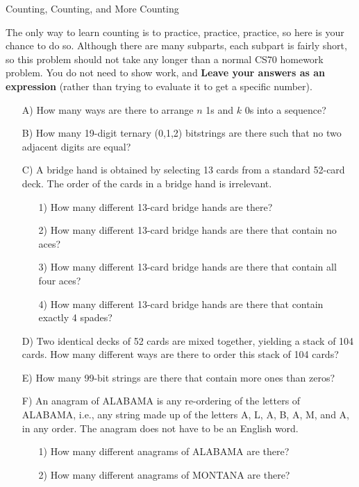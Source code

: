 \begin{homeworkProblem}{Counting, Counting, and More Counting}

The only way to learn counting is to practice, practice, practice, so
here is your chance to do so. Although there are many subparts, each 
subpart is fairly short, so this problem should not take any longer 
than a normal CS70 homework problem. You do not need to show work, and
\textbf{Leave your answers as an expression} (rather than trying to 
evaluate it to get a specific number).
\begin{itemize}

\item[A)] How many ways are there to arrange $n$ 1s and $k$ 0s into a 
sequence?

\item[B)] How many 19-digit ternary (0,1,2) bitstrings are there such 
that no two adjacent digits are equal?

\item[C)] A bridge hand is obtained by selecting 13 cards from a 
standard 52-card deck. The order of the cards in a bridge hand is 
irrelevant.
  \begin{itemize}
    \item[1)] How many different 13-card bridge hands are there? 
    \item[2)] How many different 13-card bridge hands are there that 
    contain no aces? 
    \item[3)] How many different 13-card bridge hands are there that 
    contain all four aces? 
    \item[4)] How many different 13-card bridge hands are there that 
    contain exactly 4 spades?
  \end{itemize}

\item[D)] Two identical decks of 52 cards are mixed together, yielding 
a stack of 104 cards. How many different ways are there to order this 
stack of 104 cards?
  
\item[E)] How many 99-bit strings are there that contain more ones than 
zeros?
  
\item[F)] An anagram of ALABAMA is any re-ordering of the letters of 
ALABAMA, i.e., any string made up of the letters A, L, A, B, A, M, and 
A, in any order. The anagram does not have to be an English word.
  \begin{itemize}
    \item[1)] How many different anagrams of ALABAMA are there? 
    \item[2)] How many different anagrams of MONTANA are there?
  \end{itemize}
 

\end{itemize}
\end{homeworkProblem}
